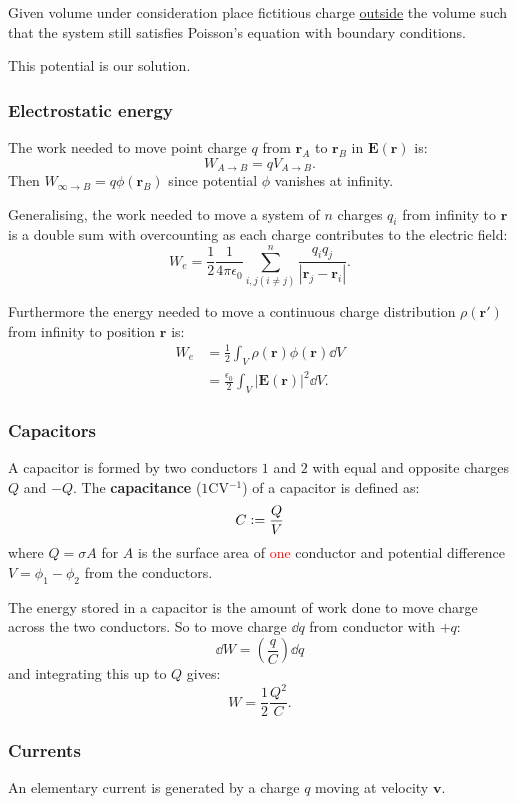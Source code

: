 \documentclass{article}
\newcommand{\deq}{\vcentcolon=}
\newcommand{\vc}[1]{\boldsymbol{#1}}
\begin{document}
\begin{multicols*}{3}
Given volume under consideration place fictitious
charge \underline{outside} the volume such that the system
still satisfies Poisson's equation with boundary conditions.

This potential is our solution.

\subsubsection*{Electrostatic energy}
The work needed to move point charge $q$
from $\vc{r}_A$ to $\vc{r}_B$ in $\vc{E}(\vc{r})$ is:
$$W_{A\rightarrow B}=q V_{A\rightarrow B}.$$
Then $W_{\infty\rightarrow B}=q\phi(\vc{r}_B)$
since potential $\phi$ vanishes at infinity.

Generalising, the work needed to move a system of
$n$ charges $q_i$ from infinity to $\vc{r}$
is a double sum with overcounting as each charge 
contributes to the electric field:
$$W_e=\frac{1}{2}\frac{1}{4\pi\epsilon_0}
\sum_{i,j (i\neq j)}^{n}\frac{q_i q_j}
{|\vc{r}_j-\vc{r}_i|}.$$

Furthermore the energy needed to move a continuous
charge distribution $\rho(\vc{r}')$ from infinity 
to position $\vc{r}$ is:
\begin{align*}
    W_e
    &=\frac{1}{2}\int_V
    \rho(\vc{r})\phi(\vc{r})\dd V \\
    &=\frac{\epsilon_0}{2}\int_V|\vc{E}(\vc{r})|^2\dd V.
\end{align*}

\subsubsection*{Capacitors}
A capacitor is formed by two conductors 
$1$ and $2$ with equal and opposite charges $Q$ and $-Q$.
The \textbf{capacitance} ($1$CV$^{-1}$) of a
capacitor is defined as:
$$C\deq\frac{Q}{V}$$
where $Q=\sigma A$ for $A$ is the surface area of 
\textcolor{red}{one} conductor and potential
difference $V=\phi_1-\phi_2$ from the conductors.

The energy stored in a capacitor is the amount
of work done to move charge across the two conductors.
So to move charge $\dd q$ from conductor with $+q$:
$$\dd W=\left(\frac{q}{C}\right)\dd q$$
and integrating this up to $Q$ gives:
$$W=\frac{1}{2}\frac{Q^2}{C}.$$

\subsubsection*{Currents}
An elementary current is generated
by a charge $q$ moving at velocity $\vc{v}$.


\end{multicols*}
\end{document}
